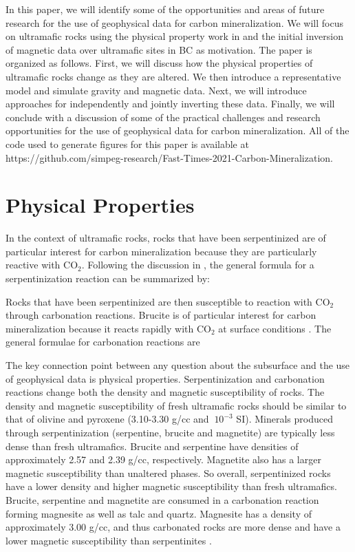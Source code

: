 \documentclass[
    paper,
  ]{geophysics}
\begin{document}
In this paper, we will identify some of the opportunities and areas of future research for the use of geophysical data for carbon mineralization. We will focus on ultramafic rocks using the physical property work in \citep{Cutts2021} and the initial inversion of magnetic data over ultramafic sites in BC \citep{Mitchinson2020} as motivation. The paper is organized as follows. First, we will discuss how the physical properties of ultramafic rocks change as they are altered. We then introduce a representative model and simulate gravity and magnetic data. Next, we will introduce approaches for independently and jointly inverting these data. Finally, we will conclude with a discussion of some of the practical challenges and research opportunities for the use of geophysical data for carbon mineralization. All of the code used to generate figures for this paper is available at https://github.com/simpeg-research/Fast-Times-2021-Carbon-Mineralization.



\section{Physical Properties}
In the context of ultramafic rocks, rocks that have been serpentinized are of particular interest for carbon mineralization because they are particularly reactive with CO$_2$. Following the discussion in \cite{Cutts2021}, the general formula for a serpentinization reaction can be summarized by:



Rocks that have been serpentinized are then susceptible to reaction with CO$_2$ through carbonation reactions. Brucite is of particular interest for carbon mineralization because it reacts rapidly with CO$_2$ at surface conditions \citep{Kelemen2019}. The general formulae for carbonation reactions are \citep{Hansen2005}



The key connection point between any question about the subsurface and the use of geophysical data is physical properties. Serpentinization and carbonation reactions change both the density and magnetic susceptibility of rocks. The density and magnetic susceptibility of fresh ultramafic rocks should be similar to that of olivine and pyroxene (3.10-3.30 g/cc and $~10^{-3}$ SI). Minerals produced through serpentinization (serpentine, brucite and magnetite) are typically less dense than fresh ultramafics. Brucite and serpentine have densities of approximately 2.57 and 2.39 g/cc, respectively. Magnetite also has a larger magnetic susceptibility than unaltered phases. So overall, serpentinized rocks have a lower density and higher magnetic susceptibility than fresh ultramafics. Brucite, serpentine and magnetite are consumed in a carbonation reaction forming magnesite as well as talc and quartz. Magnesite has a density of approximately 3.00 g/cc, and thus carbonated rocks are more dense and have a lower magnetic susceptibility than serpentinites \citep{Cutts2021, Hansen2005}.
\end{document}
